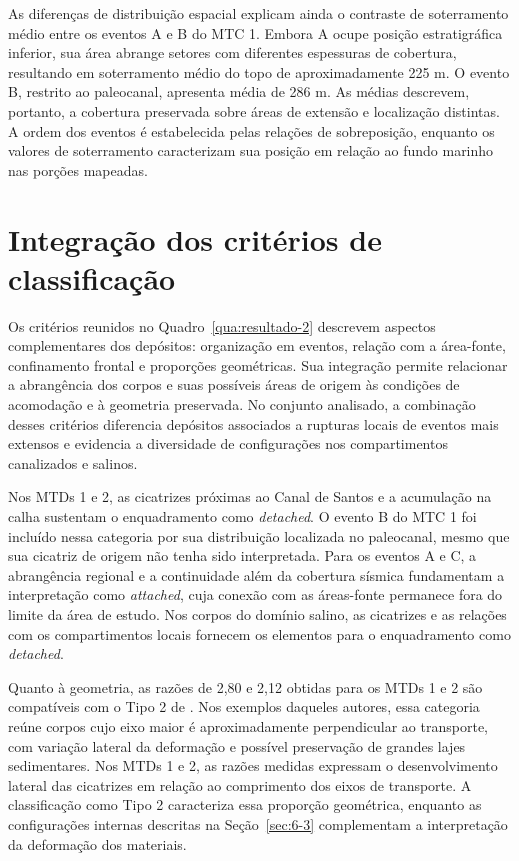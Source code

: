 As diferenças de distribuição espacial explicam ainda o contraste de soterramento médio entre os eventos A e B do MTC 1. Embora A ocupe posição estratigráfica inferior, sua área abrange setores com diferentes espessuras de cobertura, resultando em soterramento médio do topo de aproximadamente 225 m. O evento B, restrito ao paleocanal, apresenta média de 286 m. As médias descrevem, portanto, a cobertura preservada sobre áreas de extensão e localização distintas. A ordem dos eventos é estabelecida pelas relações de sobreposição, enquanto os valores de soterramento caracterizam sua posição em relação ao fundo marinho nas porções mapeadas.

\section{Integração dos critérios de classificação}\label{sec:6-6}

Os critérios reunidos no Quadro~\ref{qua:resultado-2} descrevem aspectos complementares dos depósitos: organização em eventos, relação com a área-fonte, confinamento frontal e proporções geométricas. Sua integração permite relacionar a abrangência dos corpos e suas possíveis áreas de origem às condições de acomodação e à geometria preservada. No conjunto analisado, a combinação desses critérios diferencia depósitos associados a rupturas locais de eventos mais extensos e evidencia a diversidade de configurações nos compartimentos canalizados e salinos.

Nos MTDs 1 e 2, as cicatrizes próximas ao Canal de Santos e a acumulação na calha sustentam o enquadramento como \textit{detached}. O evento B do MTC 1 foi incluído nessa categoria por sua distribuição localizada no paleocanal, mesmo que sua cicatriz de origem não tenha sido interpretada. Para os eventos A e C, a abrangência regional e a continuidade além da cobertura sísmica fundamentam a interpretação como \textit{attached}, cuja conexão com as áreas-fonte permanece fora do limite da área de estudo. Nos corpos do domínio salino, as cicatrizes e as relações com os compartimentos locais fornecem os elementos para o enquadramento como \textit{detached}.

Quanto à geometria, as razões de 2,80 e 2,12 obtidas para os MTDs 1 e 2 são compatíveis com o Tipo 2 de . Nos exemplos daqueles autores, essa categoria reúne corpos cujo eixo maior é aproximadamente perpendicular ao transporte, com variação lateral da deformação e possível preservação de grandes lajes sedimentares. Nos MTDs 1 e 2, as razões medidas expressam o desenvolvimento lateral das cicatrizes em relação ao comprimento dos eixos de transporte. A classificação como Tipo 2 caracteriza essa proporção geométrica, enquanto as configurações internas descritas na Seção~\ref{sec:6-3} complementam a interpretação da deformação dos materiais.


